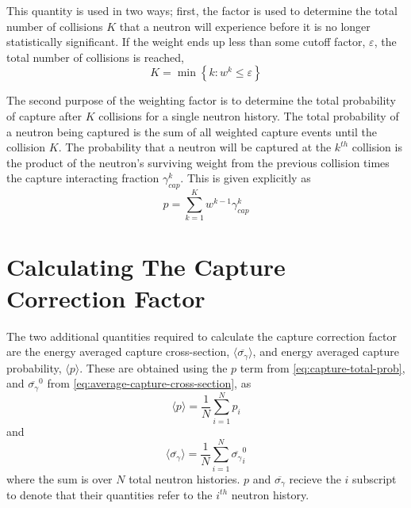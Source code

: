 This quantity is used in two ways; first, the factor is used to determine the total number of collisions $K$ that a neutron will experience before it is no longer statistically significant. If the weight ends up less than some cutoff factor, $\varepsilon$, the total number of collisions is reached,
\begin{equation}
    \label{eq:collision-counter}
    K = \min{ \left\{ k : w^{k} \leq \varepsilon \right\}}
\end{equation}

The second purpose of the weighting factor is to determine the total probability of capture after $K$ collisions for a single neutron history. The total probability of a neutron being captured is the sum of all weighted capture events until the collision $K$. The probability that a neutron will be captured at the $k^{th}$ collision is the product of the neutron's surviving weight from the previous collision times the capture interacting fraction $\gamma_{cap}^{k}$. This is given explicitly as
\begin{equation}
    \label{eq:capture-total-prob}
     p = \sum_{k=1}^{K} w^{k-1}\gamma_{cap}^{k}
\end{equation}

\section{Calculating The Capture Correction Factor}
\label{sec:capture-correction-factor}

The two additional quantities required to calculate the capture correction factor are the energy averaged capture cross-section, $\langle \overline{\sigma_{\gamma}} \rangle$, and energy averaged capture probability, $\langle p \rangle$. These are obtained using the $p$ term from \autoref{eq:capture-total-prob}, and $\overline{\sigma_{\gamma}}^{0}$ from \autoref{eq:average-capture-cross-section}, as
\begin{equation}
    \label{eq:avg-capture-prob}
    \langle p \rangle = \frac{1}{N} \sum_{i=1}^{N} p_{i}
\end{equation}
and
\begin{equation}
    \label{eq:avg-capture-xs}
    \langle \overline{\sigma_{\gamma}} \rangle = \frac{1}{N} \sum_{i=1}^{N} \overline{\sigma_{\gamma}}^{0}_{i}
\end{equation}
where the sum is over $N$ total neutron histories. $p$ and $\overline{\sigma_{\gamma}}$ recieve the $i$ subscript to denote that their quantities refer to the $i^{th}$ neutron history.


